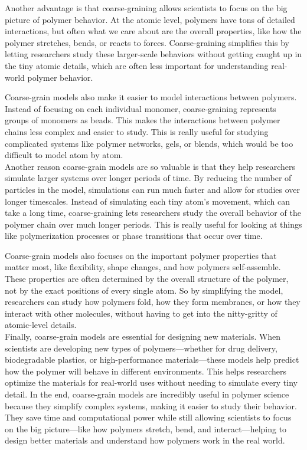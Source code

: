 \documentclass[12pt]{article}
\begin{document}
\begin{flushleft}
	Another advantage is that coarse-graining allows scientists to focus on the big picture of polymer behavior. At the atomic level, polymers have tons of detailed interactions, but often what we care about are the overall properties, like how the polymer stretches, bends, or reacts to forces. Coarse-graining simplifies this by letting researchers study these larger-scale behaviors without getting caught up in the tiny atomic details, which are often less important for understanding real-world polymer behavior.
	
	Coarse-grain models also make it easier to model interactions between polymers. Instead of focusing on each individual monomer, coarse-graining represents groups of monomers as beads. This makes the interactions between polymer chains less complex and easier to study. This is really useful for studying complicated systems like polymer networks, gels, or blends, which would be too difficult to model atom by atom.\\
	
	
	Another reason coarse-grain models are so valuable is that they help researchers simulate larger systems over longer periods of time. By reducing the number of particles in the model, simulations can run much faster and allow for studies over longer timescales. Instead of simulating each tiny atom’s movement, which can take a long time, coarse-graining lets researchers study the overall behavior of the polymer chain over much longer periods. This is really useful for looking at things like polymerization processes or phase transitions that occur over time.
	
	Coarse-grain models also focuses on the important polymer properties that matter most, like flexibility, shape changes, and how polymers self-assemble. These properties are often determined by the overall structure of the polymer, not by the exact positions of every single atom. So by simplifying the model, researchers can study how polymers fold, how they form membranes, or how they interact with other molecules, without having to get into the nitty-gritty of atomic-level details.\\
	
	Finally, coarse-grain models are essential for designing new materials. When scientists are developing new types of polymers—whether for drug delivery, biodegradable plastics, or high-performance materials—these models help predict how the polymer will behave in different environments. This helps researchers optimize the materials for real-world uses without needing to simulate every tiny detail.
	In the end, coarse-grain models are incredibly useful in polymer science because they simplify complex systems, making it easier to study their behavior. They save time and computational power while still allowing scientists to focus on the big picture—like how polymers stretch, bend, and interact—helping to design better materials and understand how polymers work in the real world.
	




\end{flushleft}
\end{document}
